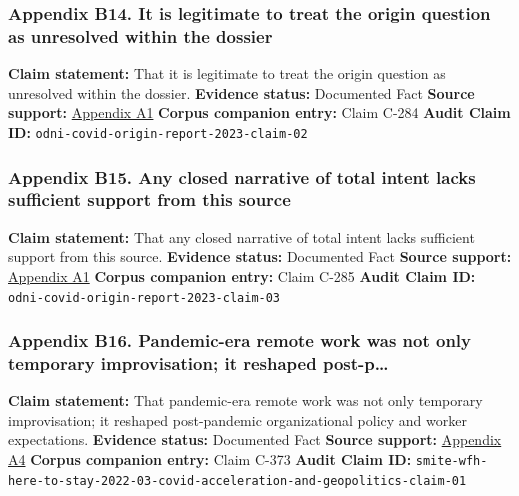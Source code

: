 \documentclass[
  american,
  11pt,
  letterpaper,
]{article}
\begin{document}
\subsubsection{Appendix B14. It is legitimate to treat the origin
question as unresolved within the
dossier}\label{ch-03-appendix-b14-it-is-legitimate-to-treat-the-origin-question-as-unresolved-within-the-dossier}

\textbf{Claim statement:} That it is legitimate to treat the origin
question as unresolved within the dossier. \textbf{Evidence status:}
Documented Fact \textbf{Source support:}
\hyperref[ch-03-appendix-a1-report-on-potential-links-between-the-wuhan-institute-of-virology-and-the-origins-of-covid-19]{Appendix
A1} \textbf{Corpus companion entry:} Claim C-284 \textbf{Audit Claim
ID:} \texttt{odni-covid-origin-report-2023-claim-02}

\subsubsection{Appendix B15. Any closed narrative of total intent lacks
sufficient support from this
source}\label{ch-03-appendix-b15-any-closed-narrative-of-total-intent-lacks-sufficient-support-from-this-source}

\textbf{Claim statement:} That any closed narrative of total intent
lacks sufficient support from this source. \textbf{Evidence status:}
Documented Fact \textbf{Source support:}
\hyperref[ch-03-appendix-a1-report-on-potential-links-between-the-wuhan-institute-of-virology-and-the-origins-of-covid-19]{Appendix
A1} \textbf{Corpus companion entry:} Claim C-285 \textbf{Audit Claim
ID:} \texttt{odni-covid-origin-report-2023-claim-03}

\subsubsection{Appendix B16. Pandemic-era remote work was not only
temporary improvisation; it reshaped
post-p\ldots{}}\label{ch-03-appendix-b16-pandemic-era-remote-work-was-not-only-temporary-improvisation-it-reshaped-post-p}

\textbf{Claim statement:} That pandemic-era remote work was not only
temporary improvisation; it reshaped post-pandemic organizational policy
and worker expectations. \textbf{Evidence status:} Documented Fact
\textbf{Source support:}
\hyperref[ch-03-appendix-a4-work-from-home-is-here-to-stay-call-for-flexibility-in-post-pandemic-work-policies]{Appendix
A4} \textbf{Corpus companion entry:} Claim C-373 \textbf{Audit Claim
ID:}
\texttt{smite-wfh-here-to-stay-2022-03-covid-acceleration-and-geopolitics-claim-01}
\end{document}
